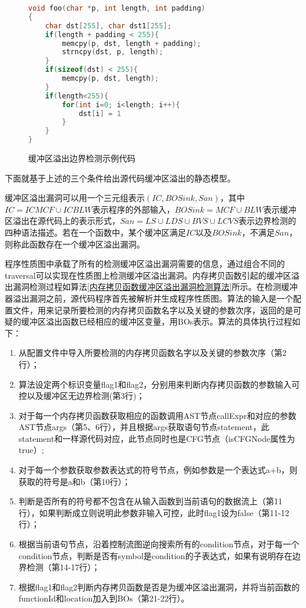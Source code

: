 {\begin{figure}[h]
\begin{lstlisting}[language=C]
void foo(char *p, int length, int padding)
{
	char dst[255], char dst1[255];
	if(length + padding < 255){
		memcpy(p, dst, length + padding);
		strncpy(dst, p, length);
	}
	if(sizeof(dst) < 255){
		memcpy(p, dst, length);
	}
	if(length<255){
		for(int i=0; i<length; i++){
			dst[i] = 1
		}
	}
}
\end{lstlisting}
\caption{缓冲区溢出边界检测示例代码}
\label{缓冲区溢出边界检测示例代码}
\end{figure}


下面就基于上述的三个条件给出源代码缓冲区溢出的静态模型。
\begin{definition}
\label{缓冲区溢出定义}
缓冲区溢出漏洞可以用一个三元组表示$(IC, BOSink, San)$，其中$IC = ICMCF \cup ICBLW$表示程序的外部输入，$BOSink = MCF \cup BLW$表示缓冲区溢出在源代码上的表示形式，$San = LS \cup LDS \cup BVS \cup LCVS$表示边界检测的四种语法描述。若在一个函数中，某个缓冲区满足$IC$以及$BOSink$，不满足$San$，则称此函数存在一个缓冲区溢出漏洞。
\end{definition}


程序性质图中承载了所有的检测缓冲区溢出漏洞需要的信息，通过组合不同的traversal可以实现在性质图上检测缓冲区溢出漏洞。内存拷贝函数引起的缓冲区溢出漏洞检测过程如算法\ref{内存拷贝函数缓冲区溢出漏洞检测算法}所示。在检测缓冲器溢出漏洞之前，源代码程序首先被解析并生成程序性质图。算法的输入是一个配置文件，用来记录所要检测的内存拷贝函数名字以及关键的参数次序，返回的是可疑的缓冲区溢出函数已经相应的缓冲区变量，用BOs表示。算法的具体执行过程如下：

\begin{enumerate}[(1)]
\item 
从配置文件中导入所要检测的内存拷贝函数名字以及关键的参数次序（第2行）；
\item
算法设定两个标识变量flag1和flag2，分别用来判断内存拷贝函数的参数输入可控以及缓冲区无边界检测(第3行)；
\item
对于每一个内存拷贝函数获取相应的函数调用AST节点callExpr和对应的参数AST节点args（第5、6行），并且根据args获取语句节点statement，此statement和一样源代码对应，此节点同时也是CFG节点（isCFGNode属性为true）;
\item 
对于每一个参数获取参数表达式的符号节点，例如参数是一个表达式a+b，则获取的符号是a和b（第10行）；
\item 
判断是否所有的符号都不包含在从输入函数到当前语句的数据流上（第11行），如果判断成立则说明此参数非输入可控，此时flag1设为false（第11-12行）；
\item 
根据当前语句节点，沿着控制流图逆向搜索所有的condition节点，对于每一个condition节点，判断是否有symbol是condition的子表达式，如果有说明存在边界检测（第14-17行）；
\item 根据flag1和flag2判断内存拷贝函数是否是为缓冲区溢出漏洞，并将当前函数的functionId和location加入到BOs（第21-22行）。
\end{enumerate}

}
